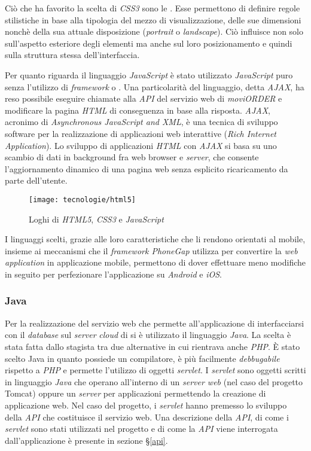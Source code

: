 Ciò che ha favorito la scelta di \textit{CSS3} sono le . Esse permettono di definire regole stilistiche in base alla tipologia del mezzo di visualizzazione, delle sue dimensioni nonchè della sua attuale disposizione (\textit{portrait} o \textit{landscape}). Ciò influisce non solo sull'aspetto esteriore degli elementi ma anche sul loro posizionamento e quindi sulla struttura stessa dell'interfaccia.

Per quanto riguarda il linguaggio \textit{JavaScript} è stato utilizzato \textit{JavaScript} puro senza l'utilizzo di \textit{framework} o . Una particolarità del linguaggio, detta \textit{AJAX}, ha reso possibile eseguire chiamate alla \textit{API} del servizio web di \textit{moviORDER} e modificare la pagina \textit{HTML} di conseguenza in base alla risposta. \textit{AJAX}, acronimo di \textit{Asynchronous JavaScript and XML}, è una tecnica di sviluppo software per la realizzazione di applicazioni web interattive (\textit{Rich Internet Application}). Lo sviluppo di applicazioni \textit{HTML} con \textit{AJAX} si basa su uno scambio di dati in background fra web browser e \textit{server}, che consente l'aggiornamento dinamico di una pagina web senza esplicito ricaricamento da parte dell'utente.

\begin{figure}[!h] 
    \centering 
    	\texttt{[image: tecnologie/html5]}
    \caption{Loghi di \textit{HTML5}, \textit{CSS3} e \textit{JavaScript}}
\end{figure}

I linguaggi scelti, grazie alle loro caratteristiche che li rendono orientati al mobile, insieme ai meccanismi che il \textit{framework PhoneGap} utilizza per convertire la \textit{web application} in applicazione mobile, permettono di dover effettuare meno modifiche in seguito per perfezionare l'applicazione su \textit{Android} e \textit{iOS}.

\subsubsection{Java}

Per la realizzazione del servizio web che permette all'applicazione di interfacciarsi con il \textit{database} sul \textit{server} \textit{cloud} di \visione{} si è utilizzato il linguaggio \textit{Java}. La scelta è stata fatta dallo stagista tra due alternative in cui rientrava anche \textit{PHP}. È stato scelto Java in quanto possiede un compilatore, è più facilmente \textit{debbugabile} rispetto a \textit{PHP} e permette l'utilizzo di oggetti \textit{servlet}.  I \textit{servlet} sono oggetti scritti in linguaggio \textit{Java} che operano all'interno di un \textit{server web} (nel caso del progetto Tomcat) oppure un \textit{server} per applicazioni permettendo la creazione di applicazione web. Nel caso del progetto, i \textit{servlet} hanno premesso lo sviluppo della \textit{API} che costituisce il servizio web. Una descrizione della \textit{API}, di come i \textit{servlet} sono stati utilizzati nel progetto e di come la \textit{API} viene interrogata dall'applicazione è presente in sezione §\ref{api}.

